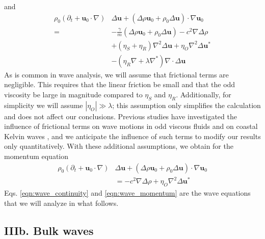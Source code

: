 \documentclass[%
 reprint,
superscriptaddress,
longbibliography,
 amsmath,amssymb,
 prl,
 citeautoscript,
]{revtex4-1}
\begin{document}
and
\begin{equation}
\begin{split}
\rho_0 \left( \partial_t + {\boldsymbol u}_0 \cdot \nabla \right) &\Delta {\boldsymbol u} + \left( \Delta \rho {\boldsymbol u}_0 + \rho_0 \Delta {\boldsymbol u} \right) \cdot \nabla {\boldsymbol u}_0 \\
= &- \frac{\gamma}{m} \left( \Delta \rho {\boldsymbol u}_0 + \rho_0 \Delta {\boldsymbol u} \right) - c^2 \nabla \Delta \rho \\
&+ \left( \eta_S + \eta_R \right) \nabla^2 \Delta {\boldsymbol u} + \eta_O \nabla^2 \Delta {\boldsymbol u}^* \\
&- \left( \eta_R \nabla + \lambda \nabla^* \right) \nabla \cdot \Delta {\boldsymbol u}
\end{split}
\label{eqn:wave_momentum_frictional}
\end{equation}
As is common in wave analysis, we will assume that frictional terms are negligible. This requires that the linear friction be small and that the odd viscosity be large in magnitude compared to $\eta_S$ and $\eta_R$. Additionally, for simplicity we will assume $\left| \eta_O \right| \gg \lambda$; this assumption only simplifies the calculation and does not affect our conclusions. Previous studies have investigated the influence of frictional terms on wave motions in odd viscous fluids \cite{boundary_waves} and on coastal Kelvin waves \cite{friction_kelvin}, and we anticipate the influence of such terms to modify our results only quantitatively. With these additional assumptions, we obtain for the momentum equation
\begin{equation}
\begin{split}
\rho_0 \left( \partial_t + {\boldsymbol u}_0 \cdot \nabla \right) &\Delta {\boldsymbol u} + \left( \Delta \rho {\boldsymbol u}_0 + \rho_0 \Delta {\boldsymbol u} \right) \cdot \nabla {\boldsymbol u}_0 \\
&= - c^2 \nabla \Delta \rho + \eta_O \nabla^2 \Delta {\boldsymbol u}^*
\end{split}
\label{eqn:wave_momentum}
\end{equation}
Eqs. \ref{eqn:wave_continuity} and \ref{eqn:wave_momentum} are the wave equations that we will analyze in what follows.

\subsection{IIIb. Bulk waves}
\end{document}
